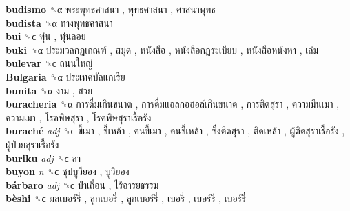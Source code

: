 \textbf{budismo} ␝α   พระพุทธศาสนา ,  พุทธศาสนา ,  ศาสนาพุทธ   \\
\textbf{budista} ␝α   ทางพุทธศาสนา   \\
\textbf{bui} ␝ϲ   ทุ่น ,  ทุ่นลอย   \\
\textbf{buki} ␝α   ประมวลกฏเกณฑ์ ,  สมุด ,  หนังสือ ,  หนังสือกฏระเบียบ ,  หนังสือหนังหา ,  เล่ม   \\
\textbf{bulevar} ␝ϲ   ถนนใหญ่   \\
\textbf{Bulgaria} ␝α   ประเทศบัลแกเรีย   \\
\textbf{bunita} ␝α   งาม ,  สวย   \\
\textbf{buracheria} ␝α   การดื่มเกินขนาด ,  การดื่มแอลกอฮอล์เกินขนาด ,  การติดสุรา ,  ความมึนเมา ,  ความเมา ,  โรคพิษสุรา ,  โรคพิษสุราเรื้อรัง   \\
\textbf{buraché} \emph{adj}  ␝ϲ   ขี้เมา ,  ขี้เหล้า ,  คนขี้เมา ,  คนขี้เหล้า ,  ซึ่งติดสุรา ,  ติดเหล้า ,  ผู้ติดสุราเรื้อรัง ,  ผู้ป่วยสุราเรื้อรัง   \\
\textbf{buriku} \emph{adj}  ␝ϲ   ลา   \\
\textbf{buyon} \emph{n}  ␝ϲ   ซุปบูวียอง ,  บูวียอง   \\
\textbf{bárbaro} \emph{adj}  ␝ϲ   ป่าเถื่อน ,  ไร้อารยธรรม   \\
\textbf{bèshi} ␝ϲ   ผลเบอร์รี่ ,  ลูกเบอรี่ ,  ลูกเบอร์รี่ ,  เบอรี่ ,  เบอร์รี ,  เบอร์รี่   \\
